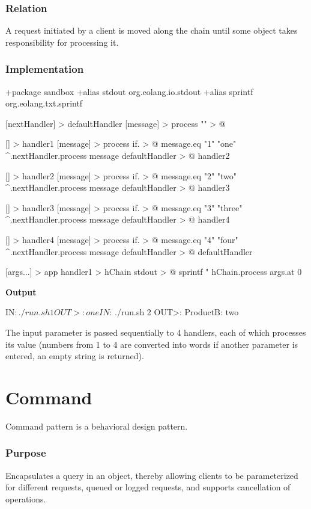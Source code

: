 \documentclass[12pt]{book}
\begin{document}
{{\subsubsection{Relation}
A request initiated by a client is moved along the chain until some  object takes responsibility for processing it.

\subsubsection{Implementation}
\begin{ffcode}
+package sandbox
+alias stdout org.eolang.io.stdout
+alias sprintf org.eolang.txt.sprintf

[nextHandler] > defaultHandler
  [message] > process
    "" > @

[] > handler1
  [message] > process
    if. > @
      message.eq "1"
      "one"
      ^.nextHandler.process message
  defaultHandler > @
    handler2

[] > handler2
  [message] > process
    if. > @
      message.eq "2"
      "two"
      ^.nextHandler.process message
  defaultHandler > @
    handler3

[] > handler3
  [message] > process
    if. > @
      message.eq "3"
      "three"
      ^.nextHandler.process message
  defaultHandler > @
    handler4

[] > handler4
  [message] > process
    if. > @
      message.eq "4"
      "four"
      ^.nextHandler.process message
  defaultHandler > @
    defaultHandler

[args...] > app
  handler1 > hChain
  stdout > @
    sprintf
      "%
      hChain.process
        args.at 0 
\end{ffcode}
\textbf{Output}
\begin{ffcode}
IN$: ./run.sh 1
OUT>: one
IN$: ./run.sh 2
OUT>: ProductB: two
\end{ffcode}

The input parameter  is passed sequentially to 4 handlers, each of which processes its value (numbers from 1 to 4 are converted into words if another parameter is entered, an empty string is returned).

\section{Command}
Command pattern is a behavioral design pattern.

\subsubsection{Purpose}
Encapsulates a query in an object, thereby allowing clients to be parameterized  for different requests, queued or logged requests, and supports cancellation of operations.

}}
\end{document}
